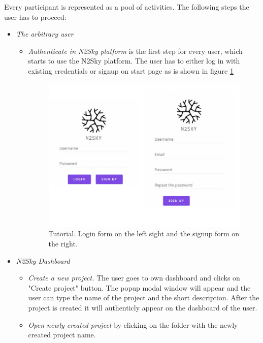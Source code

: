 Every participant is represented as a pool of activities. The following steps the user has to proceed:

\begin{itemize}
\item \emph{The arbitrary user} 
\begin{itemize}
\item \emph{Authenticate in N2Sky platform} is the first step for every user, which starts to use the N2Sky platform. 
The user has to either log in with existing credentials or signup on start page as is shown in figure \ref{fig:sign_login}

\begin{figure}[H]
\begin{center}
  \includegraphics[width=\linewidth]{components/tutorial/img/sign_login.jpg}
  \caption{Tutorial. Login form on the left sight and the signup form on the right.}
  \label{fig:sign_login}
\end{center}
\end{figure} 
\end{itemize}
\item \emph{N2Sky Dashboard} 
\begin{itemize}
\item \emph{Create a new project.} The user goes to own dashboard and clicks on "Create project" button. The popup modal window will appear and the user can type the name of the project and the short description. After the project is created it will authenticly appear on the dashboard of the user.  
\item \emph{Open newly created project} by clicking on the folder with the newly created project name.

\end{itemize}
\end{itemize}
